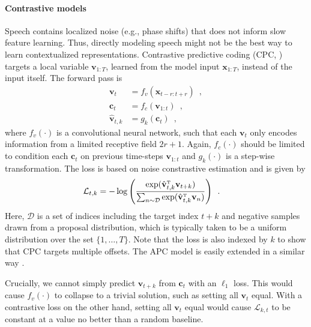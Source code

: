 {\paragraph{Contrastive models}
Speech contains localized noise (e.g., phase shifts) that does not inform slow feature learning. Thus, directly modeling speech might not be the best way to learn contextualized representations. Contrastive predictive coding (CPC,  \citealp{oord_representation_2018}) targets a local variable $\mathbf{v}_{1:T}$, learned from the model input $\mathbf{x}_{1:T}$, instead of the input itself. The forward pass is
%
\begin{align}
    \mathbf{v}_{t} &= f_{v}(\mathbf{x}_{t-r:t+r}) \enspace , \label{eq_brief: cpc local representation} \\
    \mathbf{c}_{t} &= f_{c}(\mathbf{v}_{1:t}) \enspace , \\
    \hat{\mathbf{v}}_{t,k} &= g_k(\mathbf{c}_{t}) \enspace,
\end{align}
%
\noindent where $f_v(\cdot)$ is a convolutional neural network, such that each $\mathbf{v}_{t}$ only encodes information from a limited receptive field $2r+1$. Again, $f_c(\cdot)$ should be limited to condition each $\mathbf{c}_t$ on previous time-steps $\mathbf{v}_{1:t}$ and $g_k(\cdot)$ is a step-wise transformation. The loss is based on noise constrastive estimation \parencite{gutmann_noisecontrastive_2010} and is given by
\begin{align}
    \mathcal{L}_{t,k} &= - \log \left(\frac{\exp(\hat{\mathbf{v}}_{t,k}^{\text{\tiny T}}\mathbf{v}_{t+k})}{\sum_{n \sim \mathcal{D}} \exp(\hat{\mathbf{v}}_{t,k}^{\text{\tiny T}}\mathbf{v}_{n})} \right)\enspace .
    \label{eq_brief: cpc loss}
\end{align}
%
\noindent Here, $\mathcal{D}$ is a set of indices including the target index $t+k$ and negative samples drawn from a proposal distribution, which is typically taken to be a uniform distribution over the set $\{1,\dots,T\}$. Note that the loss is also indexed by $k$ to show that CPC targets multiple offsets. The APC model is easily extended in a similar way \parencite{chung_improved_2020}.

Crucially, we cannot simply predict $\mathbf{v}_{t+k}$ from $\mathbf{c}_t$ with an $\ell_1$ loss. This would cause $f_v(\cdot)$ to collapse to a trivial solution, such as setting all $\mathbf{v}_t$ equal. With a contrastive loss on the other hand, setting all $\mathbf{v}_t$ equal would cause $\mathcal{L}_{k,t}$ to be constant at a value no better than a random baseline. 

}
